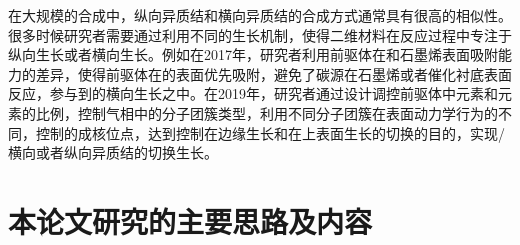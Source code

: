     在大规模的合成中，纵向异质结和横向异质结的合成方式通常具有很高的相似性。很多时候研究者需要通过利用不同的生长机制，使得二维材料在反应过程中专注于纵向生长或者横向生长。例如在2017年，研究者利用前驱体在和石墨烯表面吸附能力的差异，使得前驱体在的表面优先吸附，避免了碳源在石墨烯或者催化衬底表面反应，参与到的横向生长之中。在2019年，研究者通过设计调控前驱体中元素和元素的比例，控制气相中的分子团簇类型，利用不同分子团簇在表面动力学行为的不同，控制的成核位点，达到控制在边缘生长和在上表面生长的切换的目的，实现/横向或者纵向异质结的切换生长。

\section{本论文研究的主要思路及内容}

